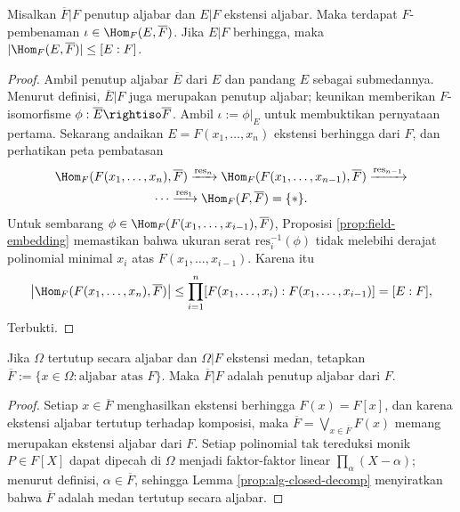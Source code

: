 \begin{corollary}\label{prop:alg-ext-embedding}
	Misalkan $\overline{F}|F$ penutup aljabar dan $E|F$ ekstensi aljabar. Maka terdapat $F$-pembenaman $\iota \in \Hom_F(E, \overline{F})$. Jika $E|F$ berhingga, maka $|\Hom_F(E, \overline{F})| \leq [E:F]$.
\end{corollary}
\begin{proof}
	Ambil penutup aljabar $\overline{E}$ dari $E$ dan pandang $E$ sebagai submedannya. Menurut definisi, $\overline{E}|F$ juga merupakan penutup aljabar; keunikan memberikan $F$-isomorfisme $\phi: \overline{E} \rightiso \overline{F}$. Ambil $\iota := \phi|_E$ untuk membuktikan pernyataan pertama. Sekarang andaikan $E = F(x_1, \ldots, x_n)$ ekstensi berhingga dari $F$, dan perhatikan peta pembatasan
	\begin{multline*}
		\Hom_F(F(x_1, \ldots, x_n), \overline{F}) \xrightarrow{\text{res}_n} \Hom_F(F(x_1, \ldots, x_{n-1}), \overline{F}) \xrightarrow{\text{res}_{n-1}} \\
		\cdots \xrightarrow{\text{res}_1} \Hom_F(F, \overline{F}) = \{\ast\}.
	\end{multline*}
	Untuk sembarang $\phi \in \Hom_F(F(x_1, \ldots, x_{i-1}), \overline{F})$, Proposisi \ref{prop:field-embedding} memastikan bahwa ukuran serat $\text{res}_i^{-1}(\phi)$ tidak melebihi derajat polinomial minimal $x_i$ atas $F(x_1, \ldots, x_{i-1})$. Karena itu
	\[ \left| \Hom_F(F(x_1, \ldots, x_n), \overline{F}) \right| \leq \prod_{i=1}^n [F(x_1, \ldots, x_i): F(x_1, \ldots, x_{i-1})] = [E:F], \]
	Terbukti.
\end{proof}

\begin{proposition}\label{prop:alg-closure-sub}
	Jika $\Omega$ tertutup secara aljabar dan $\Omega|F$ ekstensi medan, tetapkan $\overline{F} := \{ x \in \Omega: \text{aljabar atas $F$} \}$. Maka $\overline{F}|F$ adalah penutup aljabar dari $F$.
\end{proposition}
\begin{proof}
	Setiap $x \in \overline{F}$ menghasilkan ekstensi berhingga $F(x)=F[x]$, dan karena ekstensi aljabar tertutup terhadap komposisi, maka $\overline{F} = \bigvee_{x \in \overline{F}} F(x)$ memang merupakan ekstensi aljabar dari $F$. Setiap polinomial tak tereduksi monik $P \in F[X]$ dapat dipecah di $\Omega$ menjadi faktor-faktor linear $\prod_\alpha (X-\alpha)$; menurut definisi, $\alpha \in \overline{F}$, sehingga Lemma \ref{prop:alg-closed-decomp} menyiratkan bahwa $\overline{F}$ adalah medan tertutup secara aljabar.
\end{proof}

